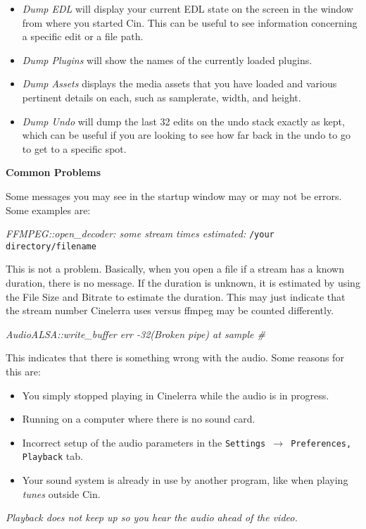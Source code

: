 \begin{itemize}[nosep]
\item \textit{Dump EDL} will display your current EDL state on the screen in the window from where you started Cin. This can be useful to see information concerning a specific edit or a file path.
\item \textit{Dump Plugins} will show the names of the currently loaded plugins.
\item \textit{Dump Assets} displays the media assets that you have loaded and various pertinent details on each, such as samplerate, width, and height.
\item \textit{Dump Undo }will dump the last 32 edits on the undo stack exactly as kept, which can be useful if you are looking to see how far back in the undo to go to get to a specific spot.
\end{itemize}

\textbf{Common Problems}

Some messages you may see in the startup window may or may not be errors. Some examples are:
\bigskip

\textit{FFMPEG::open\_decoder: some stream times estimated:} \quad \texttt{/your directory/filename}

This is not a problem. Basically, when you open a file if a stream has a known duration, there is no message. If the duration is unknown, it is estimated by using the File Size and Bitrate to estimate the duration. This may just indicate that the stream number Cinelerra uses versus ffmpeg may be counted differently.
\bigskip

\textit{AudioALSA::write\_buffer err -32(Broken pipe) at sample \#}

This indicates that there is something wrong with the audio. Some reasons for this are:
\begin{itemize}[nosep]
	\item You simply stopped playing in Cinelerra while the audio is in progress.
	\item Running on a computer where there is no sound card.
	\item Incorrect setup of the audio parameters in the \texttt{Settings $\rightarrow$ Preferences, Playback} tab.
	\item Your sound system is already in use by another program, like when playing \textit{tunes} outside Cin.
\end{itemize}
\bigskip

\textit{Playback does not keep up so you hear the audio ahead of the video.}

